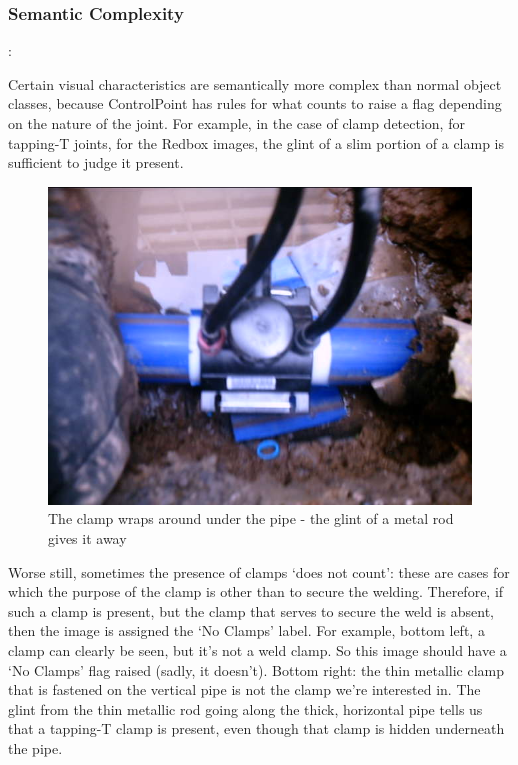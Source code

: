 \documentclass[a4paper,11pt]{article}
\begin{document}
\subsubsection{Semantic Complexity}:

Certain visual characteristics are semantically more complex than normal object classes, because ControlPoint has rules for what counts to raise a flag depending on the nature of the joint. For example, in the case of clamp detection, for tapping-T joints, for the Redbox images, the glint of a slim portion of a clamp is sufficient to judge it present. \\

\begin{figure}[h!]
	\centering
	\includegraphics[width=0.35\linewidth]{images/tapping-T.jpg}
	\caption{The clamp wraps around under the pipe - the glint of a metal rod gives it away}
\end{figure}

Worse still, sometimes the presence of clamps `does not count': these are cases for which the purpose of the clamp is other than to secure the welding. Therefore, if such a clamp is present, but the clamp that serves to secure the weld is absent, then the image is assigned the `No Clamps' label. For example, bottom left, a clamp can clearly be seen, but it's not a weld clamp. So this image should have a `No Clamps' flag raised (sadly, it doesn't). Bottom right: the thin metallic clamp that is fastened on the vertical pipe is not the clamp we're interested in. The glint from the thin metallic rod going along the thick, horizontal pipe tells us that a tapping-T clamp is present, even though that clamp is hidden underneath the pipe. 
\end{document}
